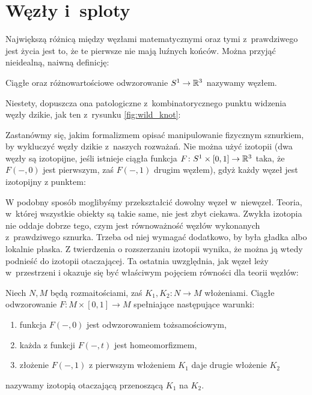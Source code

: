 \section{Węzły i~sploty}
Największą różnicą między węzłami matematycznymi oraz tymi z~prawdziwego jest życia jest to, że te pierwsze nie mają luźnych końców.
Można przyjąć nieidealną, naiwną definicję:

\begin{definition}[węzeł]
    Ciągłe oraz różnowartościowe odwzorowanie $S^1 \to \mathbb R^3$ nazywamy węzłem.
\end{definition}

Niestety, dopuszcza ona patologiczne z~kombinatorycznego punktu widzenia węzły dzikie, jak ten z~rysunku \ref{fig:wild_knot}:

Zastanówmy się, jakim formalizmem opisać manipulowanie fizycznym sznurkiem, by wykluczyć węzły dzikie z~naszych rozważań.
Nie można użyć izotopii (dwa węzły są izotopijne, jeśli istnieje ciągła funkcja $F \colon S^1 \times [0, 1] \to \mathbb R^3$ taka, że $F(-, 0)$ jest pierwszym, zaś $F(-,1)$ drugim węzłem), gdyż każdy węzeł jest izotopijny z punktem:


W podobny sposób moglibyśmy przekształcić dowolny węzeł w~niewęzeł.
Teoria, w~której wszystkie obiekty są takie same, nie jest zbyt ciekawa.
Zwykła izotopia nie oddaje dobrze tego, czym jest równoważność węzłów wykonanych z~prawdziwego sznurka.
Trzeba od niej wymagać dodatkowo, by była gładka albo lokalnie płaska.
Z twierdzenia o rozszerzaniu izotopii wynika, że można ją wtedy podnieść do izotopii otaczającej.
Ta ostatnia uwzględnia, jak węzeł leży w~przestrzeni i okazuje się być właściwym pojęciem równości dla teorii węzłów:

\begin{definition}

    Niech $N, M$ będą rozmaitościami, zaś $K_1, K_2 \colon N \to M$ włożeniami.
    Ciągłe odwzorowanie $F \colon M \times [0,1] \to M$ spełniające następujące warunki:
    \begin{enumerate}
        \item funkcja $F(-, 0)$ jest odwzorowaniem tożsamościowym,
        \item każda z funkcji $F(-, t)$ jest homeomorfizmem,
        \item złożenie $F(-, 1)$ z pierwszym włożeniem $K_1$ daje drugie włożenie $K_2$
    \end{enumerate}
    nazywamy izotopią otaczającą przenoszącą $K_1$ na $K_2$.
\end{definition}

